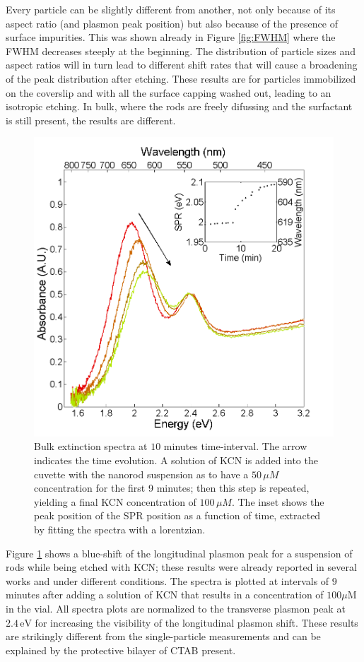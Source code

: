 \documentclass{article}
\begin{document}
Every particle can be slightly different from another, not only because of its
aspect ratio (and plasmon peak position) but also because of the presence of
surface impurities. This was shown already in Figure \ref{fig:FWHM} where the
FWHM decreases steeply at the beginning. The distribution of particle sizes and
aspect ratios will in turn lead to different shift rates that will cause a
broadening of the peak distribution after etching. These results are for
particles immobilized on the coverslip and with all the surface capping washed
out, leading to an isotropic etching. In bulk, where the rods are freely
difussing and the surfactant is still present, the results are different.

\begin{figure}[p]
 \centering 
 \includegraphics[width=0.95\linewidth]{plasmon_bulk.png}
 \caption{Bulk extinction spectra at $10$ minutes time-interval. The arrow
 indicates the time evolution. A solution of KCN is added into the cuvette with
 the nanorod suspension as to have a $50\,\mu M$ concentration for the first 9
 minutes; then this step is repeated, yielding a final KCN concentration of
 $100\, \mu M$. The inset shows the peak position of the SPR position as a
 function of time, extracted by fitting the spectra with a lorentzian.  }
 \label{fig:bulk}
\end{figure}

Figure \ref{fig:bulk} shows a blue-shift of the longitudinal plasmon peak for a
suspension of rods while being etched with KCN; these results were already
reported in several works and under different
conditions\cite{Rodriguez-Fernandez2005}\cite{Tsung2006}\cite{Jana2002}. The
spectra is plotted at intervals of $9$ minutes after adding a solution of KCN
that results in a concentration of $100\mu\textrm{M}$ in the vial. All spectra
plots are normalized to the transverse plasmon peak at $2.4\,\textrm{eV}$ for increasing
the visibility of the longitudinal plasmon shift. These results are strikingly
different from the single-particle measurements and can be explained by the
protective bilayer of CTAB present.
\end{document}
